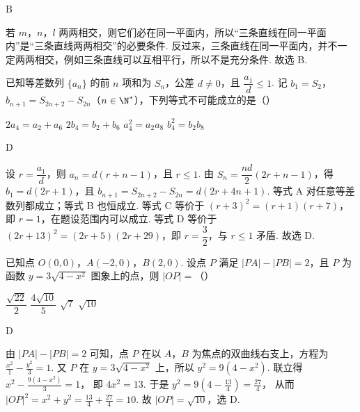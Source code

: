 \begin{answer}
B
\end{answer}

\begin{solution}
若 \(m\)，\(n\)，\(l\) 两两相交，则它们必在同一平面内，所以“三条直线在同一平面内”是“三条直线两两相交”的必要条件.
反过来，三条直线在同一平面内，并不一定两两相交，例如三条直线可以互相平行，所以不是充分条件.
故选 B.
\end{solution}

\begin{problem}
已知等差数列 \(\{a_n\}\) 的前 \(n\) 项和为 \(S_n\)，公差 \(d\neq0\)，且 \(\dfrac{a_1}{d}\le1\). 记 \(b_1=S_2\)，\(b_{n+1}=S_{2n+2}-S_{2n}\)（\(n\in\N^*\)），下列等式不可能成立的是（\quad）

\choices
    {\(2a_4=a_2+a_6\)}
    {\(2b_4=b_2+b_6\)}
    {\(a_4^2=a_2a_8\)}
    {\(b_4^2=b_2b_8\)}
\end{problem}

\begin{answer}
D
\end{answer}

\begin{solution}
设 \(r=\dfrac{a_1}{d}\)，则 \(a_n=d(r+n-1)\)，且 \(r\le1\).
由 \(S_n=\dfrac{nd}{2}\left(2r+n-1\right)\)，得
\(b_1=d(2r+1)\)，且 \(b_{n+1}=S_{2n+2}-S_{2n}=d(2r+4n+1)\).
等式 A 对任意等差数列都成立；等式 B 也恒成立.
等式 C 等价于
\((r+3)^2=(r+1)(r+7)\)，即 \(r=1\)，在题设范围内可以成立.
等式 D 等价于
\((2r+13)^2=(2r+5)(2r+29)\)，即 \(r=\dfrac32\)，与 \(r\le1\) 矛盾.
故选 D.
\end{solution}

\begin{problem}
已知点 \(O(0,0)\)，\(A(-2,0)\)，\(B(2,0)\). 设点 \(P\) 满足 \(|PA|-|PB|=2\)，且 \(P\) 为函数 \(y=3\sqrt{4-x^2}\) 图象上的点，则 \(|OP|=\)（\quad）

\choices
    {\(\dfrac{\sqrt{22}}{2}\)}
    {\(\dfrac{4\sqrt{10}}{5}\)}
    {\(\sqrt7\)}
    {\(\sqrt{10}\)}
\end{problem}

\begin{answer}
D
\end{answer}

\begin{solution}
由 \(|PA|-|PB|=2\) 可知，点 \(P\) 在以 \(A\)，\(B\) 为焦点的双曲线右支上，方程为
\(\frac{x^2}{1}-\frac{y^2}{3}=1\).
又 \(P\) 在 \(y=3\sqrt{4-x^2}\) 上，所以
\(y^2=9(4-x^2)\).
联立得
\(x^2-\frac{9(4-x^2)}{3}=1\)，
即
\(4x^2=13\).
于是
\(y^2=9\left(4-\frac{13}{4}\right)=\frac{27}{4}\)，
从而
\(|OP|^2=x^2+y^2=\frac{13}{4}+\frac{27}{4}=10\).
故 \(|OP|=\sqrt{10}\)，选 D.
\end{solution}

